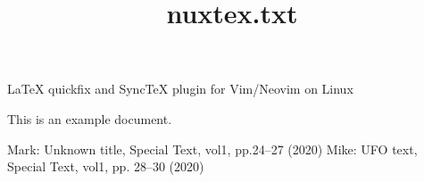 \documentclass[a4,12pt]{ujarticle}
\begin{document}
\title{nuxtex.txt}
\maketitle
\noindent
\begin{center}
LaTeX quickfix and SyncTeX plugin for Vim/Neovim on Linux
\end{center}

This is an example document.

\begin{thebibliography}{99}
Mark: Unknown title, Special Text, vol1, pp.24--27 (2020)
Mike: UFO text, Special Text, vol1, pp. 28--30 (2020)
\end{thebibliography}
\begin{thebibliography}{9}
\end{thebibliography}
\end{document}
